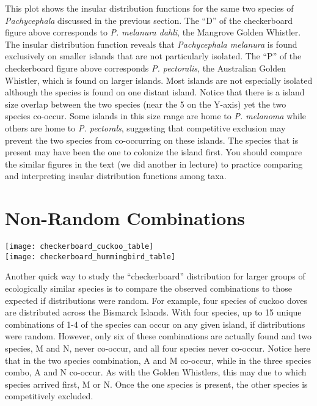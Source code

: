 \documentclass{tufte-handout}
\begin{document}
This plot shows the insular distribution functions for the same two species of \textit{Pachycephala} discussed in the previous section.   The ``D'' of the checkerboard figure above corresponds to \textit{P. melanura dahli}, the Mangrove Golden Whistler. The insular distribution function reveals that \textit{Pachycephala melanura} is found exclusively on smaller islands that are not particularly isolated. The ``P'' of the checkerboard figure above corresponds \textit{P. pectoralis}, the Australian Golden Whistler, which is found on larger islands.  Most islands are not especially isolated although the species is found on one distant island.  Notice that there is a island size overlap between the two species (near the 5 on the Y-axis) yet the two species co-occur.  Some islands in this size range are home to \textit{P. melanoma} while others are home to \textit{P. pectorals}, suggesting that competitive exclusion may prevent the two species from co-occurring on these islands.  The species that is present may have been the one to colonize the island first.  You should compare the similar figures in the text (we did another in lecture) to practice comparing and interpreting insular distribution functions among taxa.  

\section{Non-Random Combinations}
\begin{marginfigure}
	\texttt{[image: checkerboard\_cuckoo\_table]}\\
	\texttt{[image: checkerboard\_hummingbird\_table]}
\end{marginfigure}

Another quick way to study the ``checkerboard'' distribution for larger groups of ecologically similar species is to compare the observed combinations to those expected if distributions were random.  For example, four species of cuckoo doves are distributed across the Bismarck Islands.  With four species, up to 15 unique combinations of 1-4 of the species can occur on any given island, if distributions were random.  However, only six of these combinations are actually found and two species, M and N, never co-occur, and all four species never co-occur. Notice here that in the two species combination, A and M co-occur, while in the three species combo, A and N co-occur.  As with the Golden Whistlers, this may due to which species arrived first, M or N.  Once the one species is present, the other species is competitively excluded.
\end{document}
